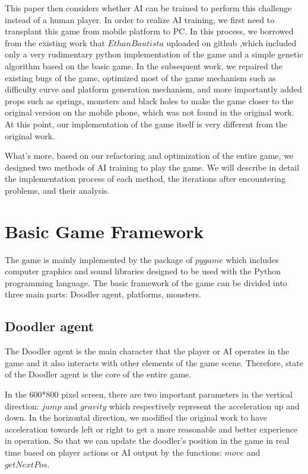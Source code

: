 \documentclass[final]{cvpr}
\begin{document}
This paper then considers whether AI can be trained to perform this challenge instead of a human player. In order to realize AI training, we first need to transplant this game from mobile platform to PC. In this process, we borrowed from the existing work that \href{https://github.com/EthanBautista/Doodle-Jump-AI}{$EthanBautista$} uploaded on github ,which included only a very rudimentary python implementation of the game and a simple genetic algorithm based on the basic game. In the subsequent work, we repaired the existing bugs of the game, optimized most of the game mechanism such as difficulty curve and platform generation mechanism, and more importantly added props such as springs, monsters and black holes to make the game closer to the original version on the mobile phone, which was not found in the original work. At this point, our implementation of the game itself is very different from the original work.

What's more, based on our refactoring and optimization of the entire game, we designed two methods of AI training to play the game. We will describe in detail the implementation process of each method, the iterations after encountering problems, and their analysis.

\section{Basic Game Framework}
The game is mainly implemented by the package of $pygame$ which includes computer graphics and sound libraries designed to be used with the Python programming language. The basic framework of the game can be divided into three main parts: Doodler agent, platforms, monsters.

\subsection{Doodler agent}
The Doodler agent is the main character that the player or AI operates in the game and it also interacts with other elements of the game scene. Therefore, state of the Doodler agent is the core of the entire game. 

In the 600*800 pixel screen, there are two important parameters in the vertical direction: $jump$ and $gravity$ which respectively
represent the acceleration up and down. In the horizontal direction, we modified the original work to have acceleration towards left or right to get a more reasonable and better experience in operation. So that we can update the doodler's position in the game in real time based on player actions or AI output by the functions: $move$ and $getNextPos$.
\end{document}
